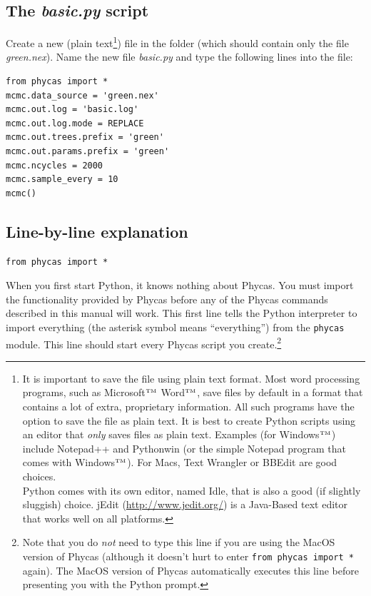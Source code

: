 \documentclass[10pt]{article}
\newcommand{\trademark}[1]{#1${}^{\mbox{\tiny TM}}$}
\newcommand{\pathname}[1]{{\em #1}}				%
\newcommand{\code}[1]{{\tt #1}}					%
\begin{document}
\subsection{The {\em basic.py} script}
Create a new (plain text\footnote{It is important to save the file using plain text format. Most word processing programs, such as \trademark{Microsoft} \trademark{Word}, save files by default in a format that contains a lot of extra, proprietary information. All such programs have the option to save the file as plain text. It is best to create Python scripts using an editor that {\em only} saves files as plain text. Examples (for \trademark{Windows}) include Notepad++ and Pythonwin (or the simple Notepad program that comes with \trademark{Windows}). For Macs, Text Wrangler or BBEdit are good choices.\\Python comes with its own editor, named Idle, that is also a good (if slightly sluggish) choice.
jEdit (\url{http://www.jedit.org/}) is a Java-Based text editor that works well on all platforms.}) file in the folder (which should contain only the file \pathname{green.nex}). Name the new file \pathname{basic.py} and type the following lines into the file:
\begin{verbatim}
from phycas import *
mcmc.data_source = 'green.nex'
mcmc.out.log = 'basic.log'
mcmc.out.log.mode = REPLACE
mcmc.out.trees.prefix = 'green'
mcmc.out.params.prefix = 'green'
mcmc.ncycles = 2000
mcmc.sample_every = 10
mcmc()
\end{verbatim}

\subsection{Line-by-line explanation} \label{subsec:basicpyexplanation}
\begin{samepage}
\begin{verbatim}
from phycas import *
\end{verbatim}
When you first start Python, it knows nothing about Phycas. You must import the functionality provided by Phycas before any of the Phycas commands described in this manual will work. This first line tells the Python interpreter to import everything (the asterisk symbol means ``everything'') from the \code{phycas} module. This line should start every Phycas script you create.\footnote{Note that you do {\em not} need to type this line if you are using the MacOS version of Phycas (although it doesn't hurt to enter \code{from phycas import *} again). The MacOS version of Phycas automatically executes this line before presenting you with the Python prompt.}
\end{samepage}
\end{document}

